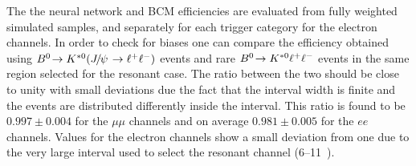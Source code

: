 The the neural network and BCM efficiencies are evaluated from fully weighted simulated samples,
and separately for each trigger category for the electron channels.
%
In order to check for biases one can compare the efficiency obtained using
$\decay{\Bz}{\Kstarz(\jpsi\to\ll)}$ events and rare ${{B}^0}\!\rightarrow {\ensuremath{{K}^{*0}}} \ell^+ \ell^-$ events
in the same \qsq region selected for the resonant case. The ratio between the two should
be close to unity with small deviations due the fact that the \qsq interval width is finite and the events
are distributed differently inside the interval. This ratio is found to be $ 0.997  \pm  0.004 $ for the
$\mu\mu$ channels and on average $0.981  \pm  0.005$ for the $ee$ channels.
Values for the electron channels show a small deviation from one due to the very large
\qsq interval used to select the resonant channel (6--11~\gevgevcccc).











